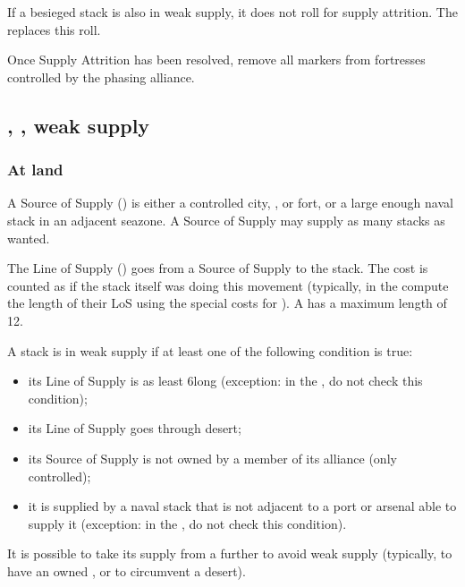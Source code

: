 If a besieged stack is also in weak supply, it does not roll for supply
attrition. The  replaces this roll.

Once Supply Attrition has been resolved, remove all \SUPPLY markers from
fortresses controlled by the phasing alliance.

\subsection{\SoS, \LoS, weak supply}
\subsubsection{At land}
A Source of Supply (\SoS) is either a controlled city, \TP, \COL or fort, or a
large enough naval stack in an adjacent seazone. A Source of Supply may supply
as many stacks as wanted.

The Line of Supply (\LoS) goes from a Source of Supply to the stack. The \MP
cost is counted as if the stack itself was doing this movement (typically, \LD
in the \ROTW compute the length of their LoS using the special \MP costs for
\LD). A \LoS has a maximum length of 12\MP.

A stack is in weak supply if at least one of the following condition is true:
\begin{itemize}
\item its Line of Supply is as least 6\MP long (exception: in the \ROTW, \LD
  do not check this condition);
\item its Line of Supply goes through desert;
\item its Source of Supply is not owned by a member of its alliance (only
  controlled);
\item it is supplied by a naval stack that is not adjacent to a port or
  arsenal able to supply it (exception: in the \ROTW, \LD do not check this
  condition).
\end{itemize}

It is possible to take its supply from a further \SoS to avoid weak supply
(typically, to have an owned \SoS, or to circumvent a desert).

